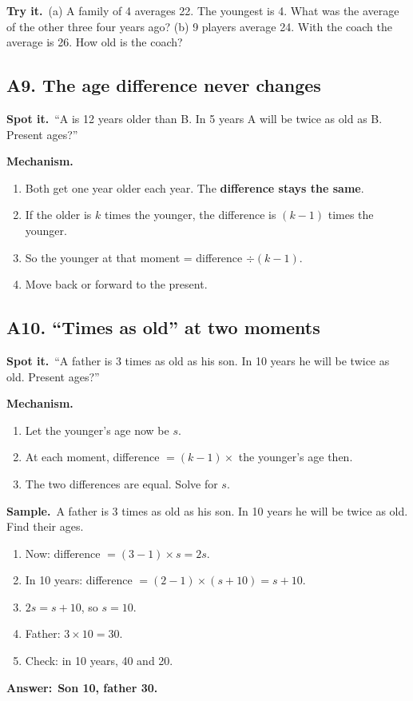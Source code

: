 \documentclass[11pt,a4paper]{article}
\let\oldsubsection\subsection
\renewcommand{\subsection}{\needspace{9\baselineskip}\oldsubsection}
\newcommand{\spot}{\textbf{\color{ember}Spot it.}\ }
\newcommand{\mech}{\textbf{\color{ember}Mechanism.}\ }
\newif\ifkeepsamp
\newcommand{\ans}[1]{\par\nopagebreak\noindent\textbf{\color{ember}Answer:}\ \textbf{#1}\par}
\newcommand{\samp}{\ifkeepsamp\needspace{4\baselineskip}\fi\textbf{\color{ember}Sample.}\ }
\newcommand{\tryit}[1]{\textbf{\color{ember}Try it.}\ #1}
\begin{document}
\tryit (a) A family of 4 averages 22. The youngest is 4. What was the average of the other three four years ago? (b) 9 players average 24. With the coach the average is 26. How old is the coach?

\subsection{A9. The age difference never changes}
\spot ``A is 12 years older than B. In 5 years A will be twice as old as B. Present ages?''

\mech
\begin{enumerate}
\item Both get one year older each year. The \textbf{difference stays the same}.
\item If the older is $k$ times the younger, the difference is $(k - 1)$ times the younger.
\item So the younger at that moment = difference $\div (k - 1)$.
\item Move back or forward to the present.
\end{enumerate}

\subsection{A10. ``Times as old'' at two moments}
\spot ``A father is 3 times as old as his son. In 10 years he will be twice as old. Present ages?''

\mech
\begin{enumerate}
\item Let the younger's age now be $s$.
\item At each moment, difference $= (k - 1) \times$ the younger's age then.
\item The two differences are equal. Solve for $s$.
\end{enumerate}

\samp A father is 3 times as old as his son. In 10 years he will be twice as old. Find their ages.
\begin{enumerate}
\item Now: difference $= (3 - 1) \times s = 2s$.
\item In 10 years: difference $= (2 - 1) \times (s + 10) = s + 10$.
\item $2s = s + 10$, so $s = 10$.
\item Father: $3 \times 10 = 30$.
\item Check: in 10 years, 40 and 20.
\end{enumerate}
\ans{Son 10, father 30.}
\end{document}
